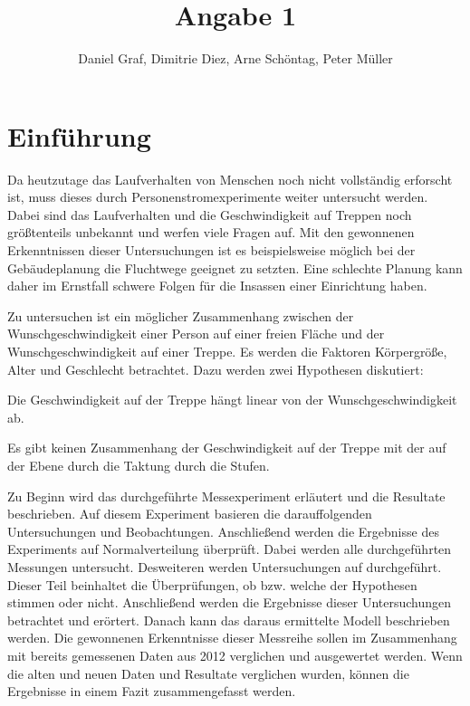 
 
\title{Angabe 1}
\providecommand{\subtitle}[1]{}
\subtitle{Untertitel}
\author{Daniel Graf, Dimitrie Diez, Arne Schöntag, Peter Müller}
\date{}


\maketitle


\tableofcontents

\section{Einführung}
Da heutzutage das Laufverhalten von Menschen noch nicht vollständig erforscht ist, muss dieses durch Personenstromexperimente weiter untersucht werden. Dabei sind das Laufverhalten und die Geschwindigkeit auf Treppen noch größtenteils unbekannt und werfen viele Fragen auf. Mit den gewonnenen Erkenntnissen dieser Untersuchungen ist es beispielsweise möglich bei der Gebäudeplanung die Fluchtwege geeignet zu setzten. Eine schlechte Planung kann daher im Ernstfall schwere Folgen für die Insassen einer Einrichtung haben.

Zu untersuchen ist ein möglicher Zusammenhang zwischen der Wunschgeschwindigkeit einer Person auf einer freien Fläche und der Wunschgeschwindigkeit auf einer Treppe. Es werden die Faktoren Körpergröße, Alter und Geschlecht betrachtet.
Dazu werden zwei Hypothesen diskutiert:
\begin{list}{-}{}
	\item Die Geschwindigkeit auf der Treppe hängt linear von der Wunschgeschwindigkeit ab.
	\item Es gibt keinen Zusammenhang der Geschwindigkeit auf der Treppe mit der auf der Ebene durch die Taktung durch die Stufen.
\end{list}
 
Zu Beginn wird das durchgeführte Messexperiment erläutert und die Resultate beschrieben. Auf diesem Experiment basieren die darauffolgenden Untersuchungen und Beobachtungen. Anschließend werden die Ergebnisse des Experiments auf Normalverteilung überprüft. Dabei werden alle durchgeführten Messungen untersucht. Desweiteren werden Untersuchungen auf durchgeführt. Dieser Teil beinhaltet die Überprüfungen, ob bzw. welche der Hypothesen stimmen oder nicht. Anschließend werden die Ergebnisse dieser Untersuchungen betrachtet und erörtert.
Danach kann das daraus ermittelte Modell beschrieben werden.
Die gewonnenen Erkenntnisse dieser Messreihe sollen im Zusammenhang mit bereits gemessenen Daten aus 2012 verglichen und ausgewertet werden.
Wenn die alten und neuen Daten und Resultate verglichen wurden, können die Ergebnisse in einem Fazit zusammengefasst werden.

